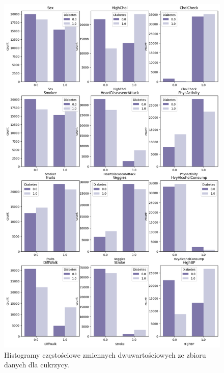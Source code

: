\documentclass[onecolumn,12pt]{article}
\begin{document}
\begin{figure}[H]
    \centering
    \includegraphics[width=0.8\linewidth]{raport/graphs/diabetes_binary.png}
    \captionsetup{justification=centering}
    \caption{Histogramy częstościowe zmiennych dwuwartościowych ze zbioru danych dla cukrzycy.}
    \label{fig:enter-label}
\end{figure}
\end{document}
